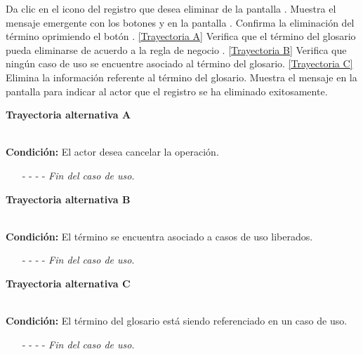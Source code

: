 	\begin{UCtrayectoria}
		\UCpaso[\UCactor] Da clic en el icono \eliminar del registro que desea eliminar de la pantalla .
		\UCpaso[\UCsist] Muestra el mensaje emergente  con los botones  y  en la pantalla .
		\UCpaso[\UCactor] Confirma la eliminación del término oprimiendo el botón . \hyperlink{CU6-3:TAA}{[Trayectoria A]}
		\UCpaso[\UCsist] Verifica que el término del glosario pueda eliminarse de acuerdo a la regla de negocio . \hyperlink{CU6-3:TAB}{[Trayectoria B]}
		\UCpaso[\UCsist] Verifica que ningún caso de uso se encuentre asociado al término del glosario. \hyperlink{CU6-3:TAC}{[Trayectoria C]}
		\UCpaso[\UCsist] Elimina la información referente al término del glosario.
		\UCpaso[\UCsist] Muestra el mensaje  en la pantalla  para indicar al actor que el registro se ha eliminado exitosamente.
	\end{UCtrayectoria}		


\hypertarget{CU6-3:TAA}{\textbf{Trayectoria alternativa A}}\\
\noindent \textbf{Condición:} El actor desea cancelar la operación.
\begin{enumerate}
	\UCpaso[\UCactor] Oprime el botón  de la pantalla emergente.
	\UCpaso[\UCsist] Muestra la pantalla .
	\item[- -] - - {\em {Fin del caso de uso}}.%
\end{enumerate}	
\hypertarget{CU6-3:TAB}{\textbf{Trayectoria alternativa B}}\\
\noindent \textbf{Condición:} El término se encuentra asociado a casos de uso liberados.
\begin{enumerate}
	\UCpaso[\UCsist] Oculta el botón \eliminar del término que esta asociado a casos de uso liberados.
	\item[- -] - - {\em {Fin del caso de uso}}.
\end{enumerate}
\hypertarget{CU6-3:TAC}{\textbf{Trayectoria alternativa C}}\\
\noindent \textbf{Condición:} El término del glosario está siendo referenciado en un caso de uso.
\begin{enumerate}
	\UCpaso[\UCsist] Muestra el mensaje  en la pantalla .
	\item[- -] - - {\em {Fin del caso de uso}}.
\end{enumerate}

